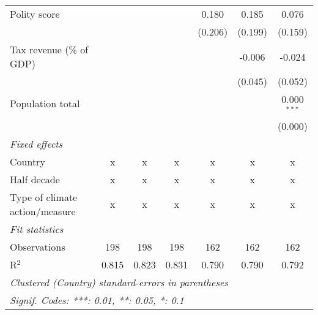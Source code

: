 \begin{tabular}{lcccccc}
   Polity score                                            &               &                &                & 0.180          & 0.185          & 0.076\\   
                                                           &               &                &                & (0.206)        & (0.199)        & (0.159)\\   
   Tax revenue (\% of GDP)                                 &               &                &                &                & -0.006         & -0.024\\   
                                                           &               &                &                &                & (0.045)        & (0.052)\\   
   Population total                                        &               &                &                &                &                & 0.000$^{***}$\\   
                                                           &               &                &                &                &                & (0.000)\\   
   \emph{Fixed effects}\\
   Country                                                 & x             & x              & x              & x              & x              & x\\  
   Half decade                                             & x             & x              & x              & x              & x              & x\\  
   Type of climate action/measure                          & x             & x              & x              & x              & x              & x\\  
   \midrule \emph{Fit statistics}\\
   Observations                                            & 198           & 198            & 198            & 162            & 162            & 162\\  
   R$^2$                                                   & 0.815         & 0.823          & 0.831          & 0.790          & 0.790          & 0.792\\  
   \midrule
   \multicolumn{7}{l}{\emph{Clustered (Country) standard-errors in parentheses}}\\
   \multicolumn{7}{l}{\emph{Signif. Codes: ***: 0.01, **: 0.05, *: 0.1}}\\
\end{tabular}
\par\endgroup


